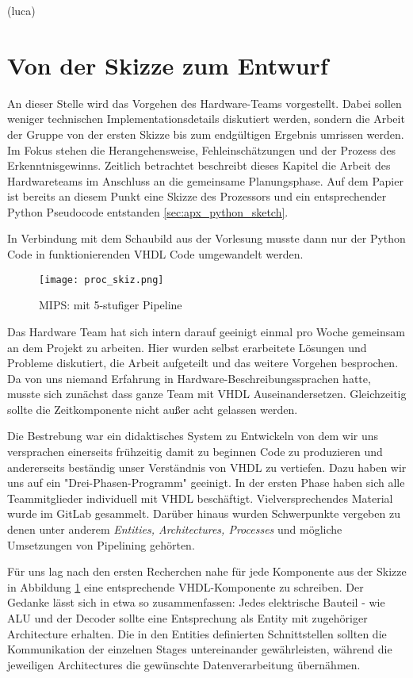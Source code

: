 \documentclass[paper=a4,fontsize=12pt,twocolumn]{scrreprt}
\begin{document}
(luca)

\section{Von der Skizze zum Entwurf}
\label{sec:von_der_skizze_zum_entwurf}

An dieser Stelle wird das Vorgehen des Hardware-Teams vorgestellt.
Dabei sollen weniger technischen Implementationsdetails diskutiert werden, sondern die Arbeit der Gruppe von der ersten Skizze bis zum endgültigen Ergebnis umrissen werden.
Im Fokus stehen die Herangehensweise, Fehleinschätzungen und der Prozess des Erkenntnisgewinns.
Zeitlich betrachtet beschreibt dieses Kapitel die Arbeit des Hardwareteams im Anschluss an die gemeinsame Planungsphase.
Auf dem Papier ist bereits an diesem Punkt eine Skizze des Prozessors und ein entsprechender Python Pseudocode entstanden \ref{sec:apx_python_sketch}.

In Verbindung mit dem Schaubild aus der Vorlesung \textcite[]{rsvorlesung} musste dann nur der Python Code in funktionierenden VHDL Code umgewandelt werden.

\begin{figure}
    \centering
    \texttt{[image: proc\_skiz.png]}
    \caption{MIPS: mit 5-stufiger Pipeline}
    \label{fig:proc_skiz}
\end{figure}

Das Hardware Team hat sich intern darauf geeinigt einmal pro Woche gemeinsam an dem Projekt zu arbeiten. 
Hier wurden selbst erarbeitete Lösungen und Probleme diskutiert, die Arbeit aufgeteilt und das weitere Vorgehen besprochen.
Da von uns niemand Erfahrung in Hardware-Beschreibungssprachen hatte, musste sich zunächst dass ganze Team mit VHDL Auseinandersetzen.
Gleichzeitig sollte die Zeitkomponente nicht außer acht gelassen werden.

Die Bestrebung war ein didaktisches System zu Entwickeln von dem wir uns versprachen einerseits frühzeitig damit zu beginnen Code zu produzieren und andererseits beständig unser Verständnis von VHDL zu vertiefen.
Dazu haben wir uns auf ein "Drei-Phasen-Programm" geeinigt. In der ersten Phase haben sich alle Teammitglieder individuell mit VHDL beschäftigt.
Vielversprechendes Material wurde im GitLab gesammelt.
Darüber hinaus wurden Schwerpunkte vergeben zu denen unter anderem \textit{Entities, Architectures, Processes} und mögliche Umsetzungen von Pipelining gehörten.

Für uns lag nach den ersten Recherchen nahe für jede Komponente aus der Skizze in Abbildung \ref{fig:proc_skiz} eine entsprechende VHDL-Komponente zu schreiben.
Der Gedanke lässt sich in etwa so zusammenfassen: Jedes elektrische Bauteil - wie ALU und der Decoder sollte eine Entsprechung als Entity mit zugehöriger Architecture erhalten.
Die in den Entities definierten Schnittstellen sollten die Kommunikation der einzelnen Stages untereinander gewährleisten, während die jeweiligen Architectures die gewünschte Datenverarbeitung übernähmen.
\end{document}
